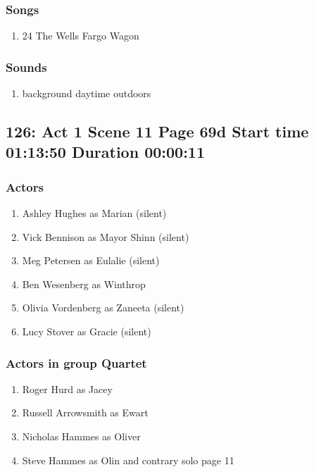 \subsubsection{Songs}
\begin{enumerate}
\item 24 The Wells Fargo Wagon
\end{enumerate}\subsubsection{Sounds}
\begin{enumerate}
\item background daytime outdoors
\end{enumerate}
\subsection{126: Act 1 Scene 11 Page 69d Start time 01:13:50 Duration 00:00:11}

\subsubsection{Actors}
\begin{enumerate}
\item Ashley Hughes as Marian (silent)
\item Vick Bennison as Mayor Shinn (silent)
\item Meg Petersen as Eulalie (silent)
\item Ben Wesenberg as Winthrop
\item Olivia Vordenberg as Zaneeta (silent)
\item Lucy Stover as Gracie (silent)
\end{enumerate}
\subsubsection{Actors in group Quartet}
\begin{enumerate}
\item Roger Hurd as Jacey
\item Russell Arrowsmith as Ewart
\item Nicholas Hammes as Oliver
\item Steve Hammes as Olin and contrary solo page 11
\end{enumerate}
